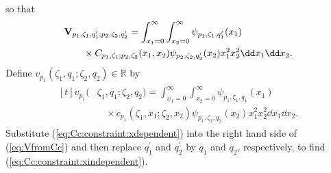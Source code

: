 so that
\begin{align}
\begin{aligned}[t]
&\mathbf{V}_{p_1,\zeta_1,q_1^\prime;p_2,\zeta_2,q_2^\prime}
=
\int_{x_1=0}^\infty
\int_{x_2=0}^\infty
\psi_{p_1,\zeta_1,q_1^\prime}(x_1)\\
&{~~~~~~}\times\CcREAL(x_1,x_2)
\psi_{p_2,\zeta_2,q_2^\prime}(x_2)
x_1^2
x_2^2
\dd x_1
\dd x_2.
\end{aligned}
\label{eq:VfromCc}
\end{align}
Define $v_{p_1}(\zeta_1,q_1;\zeta_2,q_2)\in\mathbb{R}$ by
\begin{align}
\begin{aligned}[t]
v_{p_1}(&\zeta_1,q_1;\zeta_2,q_2)
=
\int_{x_1=0}^\infty
\int_{x_2=0}^\infty
\psi_{p_1,\zeta_1,q_1}(x_1)\\
&{~~~~}\times
c_{p_1}(\zeta_1,x_1;\zeta_2,x_2)
\psi_{p_1,\zeta_2,q_2}(x_2)
x_1^2
x_2^2
\dd x_1
\dd x_2.
\end{aligned}
\end{align}
Substitute (\ref{eq:Cc:constraint:xdependent}) %
into the right hand side
of (\ref{eq:VfromCc}) %
and then replace $q_1^\prime$ and $q_2^\prime$ by
$q_1$ and $q_2$, respectively, to find (\ref{eq:Cc:constraint:xindependent}).
\vspace*{-.07in}
